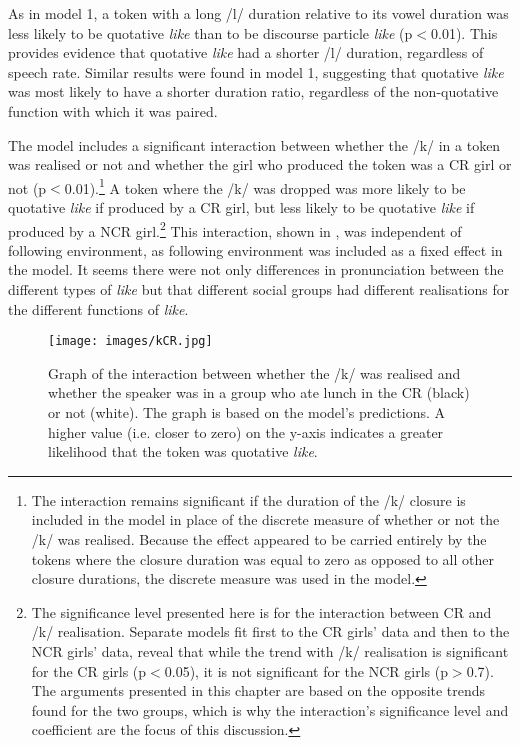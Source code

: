 \largerpage
As in model 1, a token with a long /l/ duration relative to its vowel duration was less likely to be quotative \textit{like} than to be discourse particle \textit{like} (p$<$0.01). This provides evidence that quotative \textit{like} had a shorter /l/ duration, regardless of speech rate. Similar results were found in model 1, suggesting that quotative \textit{like} was most likely to have a shorter duration ratio, regardless of the non-quotative function with which it was paired.


The model includes a significant interaction between whether the /k/ in a token was realised or not and whether the girl who produced the token was a CR girl or not (p$<$0.01).\footnote{The interaction remains significant if the duration of the /k/ closure is included in the model in place of the discrete measure of whether or not the /k/ was realised. Because the effect appeared to be carried entirely by the tokens where the closure duration was equal to zero as opposed to all other closure durations, the discrete measure was used in the model.} A token where the /k/ was dropped was more likely to be quotative \textit{like} if produced by a CR girl, but less likely to be quotative \textit{like} if produced by a NCR girl.\footnote{The significance level presented here is for the interaction between CR and /k/ realisation. Separate models fit first to the CR girls' data and then to the NCR girls' data, reveal that while the trend with /k/ realisation is significant for the CR girls (p$<$0.05), it is not significant for the NCR girls (p$>$0.7). The arguments presented in this chapter are based on the opposite trends found for the two groups, which is why the interaction's significance level and coefficient are the focus of this discussion.} This interaction, shown in , was independent of following environment, as following environment was included as a fixed effect in the model. It seems there were not only differences in pronunciation between the different types of \textit{like} but that different social groups had different realisations for the different functions of \textit{like}. 
\begin{figure}[t]
	\centering
		\texttt{[image: images/kCR.jpg]}
	\caption{Graph of the interaction between whether the /k/ was realised and whether the speaker was in a group who ate lunch in the CR (black) or not (white). The graph is based on the model's predictions. A higher value (i.e. closer to zero) on the y-axis indicates a greater likelihood that the token was quotative \textit{like}.}
	\label{fig:kCR-qdp}
\end{figure}






